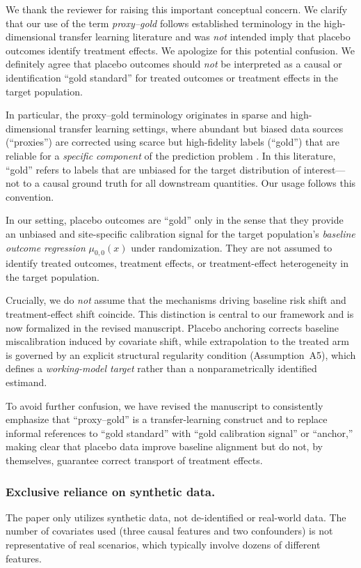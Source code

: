 {\color{blue}
We thank the reviewer for raising this important conceptual concern.  
We clarify that our use of the term \emph{proxy--gold} follows established terminology in the high-dimensional transfer learning literature and was \emph{not} intended imply that placebo outcomes identify treatment effects. We apologize for this potential confusion. 
We definitely agree that placebo outcomes should \emph{not} be interpreted as a causal or identification ``gold standard'' for treated outcomes or treatment effects in the target population.

In particular, the proxy--gold terminology originates in sparse and high-dimensional transfer learning settings, where abundant but biased data sources (``proxies'') are corrected using scarce but high-fidelity labels (``gold'') that are reliable for a \emph{specific component} of the prediction problem \citep{bastani2021predicting, li2022transfer, tian2023transfer}. In this literature, ``gold'' refers to labels that are unbiased for the target distribution of interest—not to a causal ground truth for all downstream quantities. Our usage follows this convention.

In our setting, placebo outcomes are ``gold'' only in the sense that they provide an unbiased and site-specific calibration signal for the target population’s \emph{baseline outcome regression} $\mu_{0,0}(x)$ under randomization. They are not assumed to identify treated outcomes, treatment effects, or treatment-effect heterogeneity in the target population.

Crucially, we do \emph{not} assume that the mechanisms driving baseline risk shift and treatment-effect shift coincide. This distinction is central to our framework and is now formalized in the revised manuscript. Placebo anchoring corrects baseline miscalibration induced by covariate shift, while extrapolation to the treated arm is governed by an explicit structural regularity condition (Assumption~A5), which defines a \emph{working-model target} rather than a nonparametrically identified estimand.


To avoid further confusion, we have revised the manuscript to consistently emphasize that ``proxy--gold'' is a transfer-learning construct and to replace informal references to ``gold standard'' with ``gold calibration signal'' or ``anchor,'' making clear that placebo data improve baseline alignment but do not, by themselves, guarantee correct transport of treatment effects.
}


\subsubsection{Exclusive reliance on synthetic data.}  
The paper only utilizes synthetic data, not de-identified or real-world data. The number of covariates used (three causal features and two confounders) is not representative of real scenarios, which typically involve dozens of different features.

